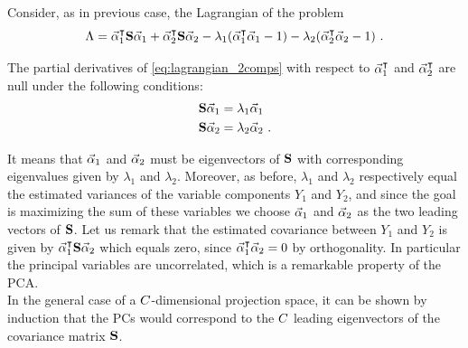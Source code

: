 Consider, as in previous case, the Lagrangian of the problem
\begin{equation}\label{eq:lagrangian_2comps}
\Lambda = \vec{\alpha}_1^\intercal \textbf{S} \vec{\alpha}_1 + \vec{\alpha}_2^\intercal\textbf{S} \vec{\alpha}_2 - \lambda_1(\vec{\alpha}_1^\intercal\vec{\alpha}_1 -1) - \lambda_2(\vec{\alpha}_2^\intercal\vec{\alpha}_2 -1) \mbox{ .}
\end{equation}

The partial derivatives of \eqref{eq:lagrangian_2comps} with respect to $\vec{\alpha}_1^\intercal$ and $\vec{\alpha}_2^\intercal$ are null under the following conditions:
\begin{align}
\textbf{S}  \vec{\alpha}_1 &= \lambda_1\vec{\alpha}_1 \\
\textbf{S}  \vec{\alpha}_2 &= \lambda_2\vec{\alpha}_2 \mbox{ .}
\end{align}

It means that $\vec{\alpha}_1$ and $\vec{\alpha}_2$ must be eigenvectors of $\textbf{S}$ with corresponding eigenvalues given by $\lambda_1$ and $\lambda_2$. Moreover, as before, $\lambda_1$ and $\lambda_2$ respectively equal the estimated variances of the variable components $Y_1$ and $Y_2$, and since the goal is maximizing the sum of these variables we choose $\vec{\alpha}_1$ and $\vec{\alpha}_2$ as the two leading vectors of $\textbf{S}$. Let us remark that the estimated covariance between $Y_1$ and $Y_2$ is given by $\vec{\alpha}_1^\intercal\textbf{S} \vec{\alpha}_2$ which equals zero, since $\vec{\alpha}_1^\intercal\vec{\alpha}_2 = 0$ by orthogonality. In particular the principal variables are uncorrelated, which is a remarkable property of the PCA. \\

In the general case of a $C$-dimensional projection space, it can be shown by induction that the PCs would correspond to the $C$ leading eigenvectors of the covariance matrix $\textbf{S}$.




